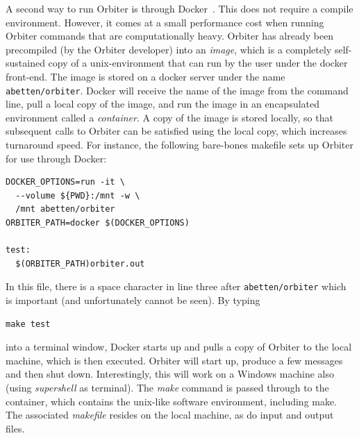 A second way to run Orbiter is through Docker~\cite{docker}. 
This does not require a compile environment.
However, it comes at a small performance cost when running Orbiter commands that are computationally heavy.
Orbiter has already been precompiled (by the Orbiter developer) 
into an {\em image}, which is a completely self-sustained 
copy of a unix-environment that can
run by the user under the docker front-end. 
The image is stored on a docker server under the name \verb'abetten/orbiter'.
Docker will receive the name of the image from the command line, 
pull a local copy of the image, and run 
the image in an encapsulated environment called a {\em container}. 
A copy of the image is stored locally, so that subsequent calls to 
Orbiter can be satisfied using the local copy, which increases turnaround speed. 
For instance, the following bare-bones makefile sets up Orbiter for use through Docker: 
\begin{verbatim}
DOCKER_OPTIONS=run -it \
  --volume ${PWD}:/mnt -w \
  /mnt abetten/orbiter 
ORBITER_PATH=docker $(DOCKER_OPTIONS)

test:
  $(ORBITER_PATH)orbiter.out
\end{verbatim}
In this file, there is a space character in line three after \verb'abetten/orbiter' 
which is important (and unfortunately cannot be seen).
By typing
\begin{verbatim}
make test
\end{verbatim}
into a terminal window, 
Docker starts up and pulls 
a copy of Orbiter to the local machine, which is then executed. 
Orbiter will start up, produce a few messages and then shut down.
Interestingly, this will work on a 
Windows machine also (using {\em supershell} as terminal). 
The {\em make} command is passed through to the container, 
which contains the unix-like software environment, including make.
The associated {\em makefile} resides on the local machine, 
as do input and output files.

